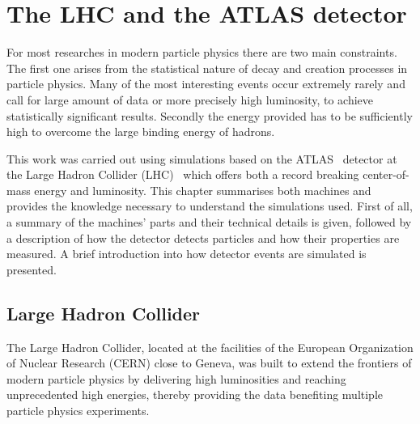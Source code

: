 

\chapter{The LHC and the ATLAS detector}
\label{chp:lhc_atlas}


For most researches in modern particle physics there are two main constraints. The first one arises from the statistical nature of decay and creation processes in particle physics. Many of the most interesting events occur extremely rarely and call for large amount of data or more precisely high luminosity, to achieve statistically significant results. Secondly the energy provided has to be sufficiently high to overcome the large binding energy of hadrons. 

This work was carried out using simulations based on the ATLAS~\cite{atlas} detector at the Large Hadron Collider (LHC)~\cite{lhc_machine} which offers both a record breaking center-of-mass energy and luminosity. This chapter summarises both machines and provides the knowledge necessary to understand the simulations used. First of all, a summary of the machines' parts and their technical details is given, followed by a description of how the detector detects particles and how their properties are measured. A brief introduction into how detector events are simulated is presented.

\section{Large Hadron Collider}

The Large Hadron Collider, located at the facilities of the European Organization of Nuclear Research (CERN) close to Geneva, was built to extend the frontiers of modern particle physics by delivering high luminosities and reaching unprecedented high energies, thereby providing the data benefiting multiple particle physics experiments.

